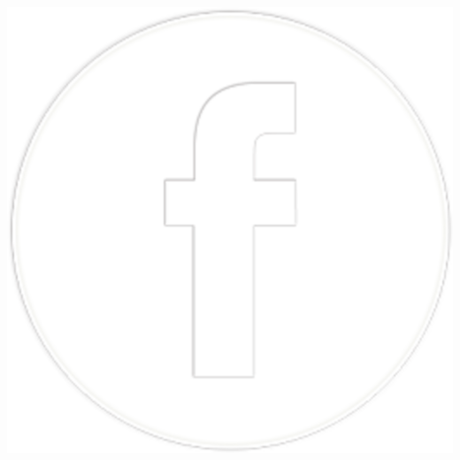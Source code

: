 \documentclass[12pt]{beamer}
\begin{document}
\begin{frame}[standout]
  		\includegraphics[scale=0.04]{res/Facebook}
  	\endgroup
\end{frame}
\end{document}
